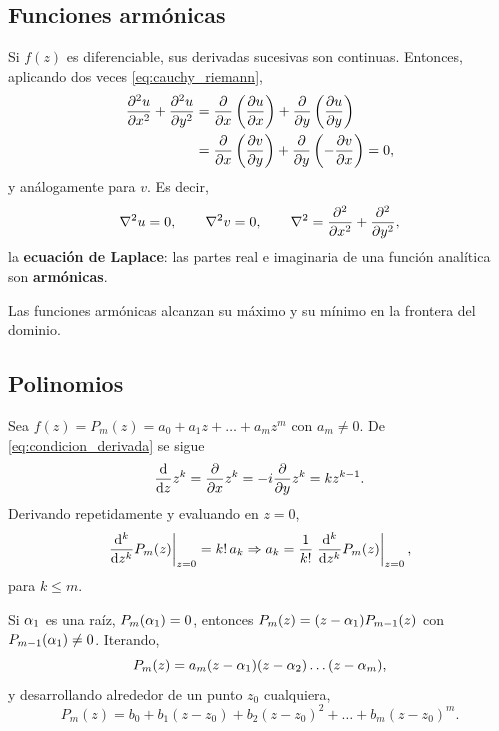 \subsection{Funciones arm\'onicas}
\label{subsec:armonicas}

Si $f(z)$ es diferenciable, sus derivadas sucesivas son continuas. Entonces,
aplicando dos veces \eqref{eq:cauchy_riemann},
\begin{equation}
  \label{eq:laplace_u}
  \begin{aligned}
    \frac{\partial^2 u}{\partial x^2}+\frac{\partial^2 u}{\partial y^2}
      &=\frac{\partial }{\partial x}\left( \frac{\partial u}{\partial x} \right)+\frac{\partial }{\partial y}\left( \frac{\partial u}{\partial y} \right)\\
      &=\frac{\partial }{\partial x}\left( \frac{\partial v}{\partial y} \right)+\frac{\partial }{\partial y}\left( -\frac{\partial v}{\partial x} \right)=0 ,
  \end{aligned}
\end{equation}
y an\'alogamente para $v$. Es decir,
\begin{equation}
  \label{eq:laplace}
  \nabla^{2} u=0,
  \qquad
  \nabla^{2} v=0,
  \qquad
  \nabla^{2}=\frac{\partial^2 }{\partial x^2}+\frac{\partial^2 }{\partial y^2},
\end{equation}
la \textbf{ecuaci\'on de Laplace}: las partes real e imaginaria de una
funci\'on anal\'itica son \textbf{arm\'onicas}.

\begin{observacion}
  Las funciones arm\'onicas alcanzan su m\'aximo y su m\'inimo en la frontera
  del dominio.
\end{observacion}

\subsection{Polinomios}
\label{subsec:polinomios}

Sea $f(z)=P_m(z)=a_0+a_1z+\dots+a_mz^m$ con $a_m\neq 0$. De
\eqref{eq:condicion_derivada} se sigue
\begin{equation}
  \label{eq:derivada_potencia_compleja}
  \frac{\mathrm{d}}{\mathrm{d}z}z^k=\frac{\partial }{\partial x}z^k=-i\frac{\partial }{\partial y}z^k=kz^{k-1} .
\end{equation}
Derivando repetidamente y evaluando en $z=0$,
\begin{equation}
  \label{eq:coeficientes_polinomio}
  \left. \frac{\mathrm{d}^{k}}{\mathrm{d}z^{k}}P_m(z) \right|_{z=0}=k!\,a_k
  \Rightarrow
  a_k=\frac{1}{k!}\left. \frac{\mathrm{d}^{k}}{\mathrm{d}z^{k}}P_m(z) \right|_{z=0},
\end{equation}
para $k\le m$.

Si $\alpha_1$ es una ra\'iz, $P_m(\alpha_1)=0$, entonces
$P_m(z)=(z-\alpha_1)P_{m-1}(z)$ con $P_{m-1}(\alpha_1)\neq 0$. Iterando,
\begin{equation}
  \label{eq:factorizacion}
  P_m(z)=a_m(z-\alpha_1)(z-\alpha_2)\dots(z-\alpha_m),
\end{equation}
y desarrollando alrededor de un punto $z_0$ cualquiera,
\begin{equation}
  \label{eq:polinomio_centrado}
  P_m(z)=b_0+b_1(z-z_0)+b_2(z-z_0)^2+\dots+b_m(z-z_0)^m .
\end{equation}
